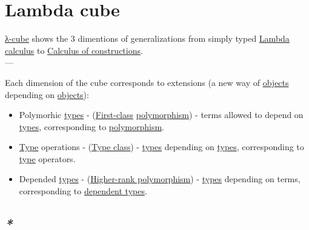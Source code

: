 \documentclass[a4paper,14pt,oneside]{book}
\begin{document}
\section{\label{org35d9cd3}Lambda cube}
\label{sec:orgd6a3689}
\hyperref[org9391efe]{λ-cube} shows the 3 dimentions of generalizations from simply typed \hyperref[orga8f06c0]{Lambda calculus} to \hyperref[org180624b]{Calculus of constructions}.\\

---\\


Each dimension of the cube corresponds to extensions (a new way of \hyperref[orgc4d2bb7]{objects} depending on \hyperref[orgc4d2bb7]{objects}):\\
\begin{itemize}
\item Polymorhic \hyperref[org7a67a19]{types} - (\hyperref[org2586625]{First-class} \hyperref[org91c794d]{polymorphism}) - terms allowed to depend on \hyperref[org7a67a19]{types}, corresponding to \hyperref[org91c794d]{polymorphism}.\\
\item \hyperref[org9303510]{Type} operations - (\hyperref[orgc7213a1]{Type class}) - \hyperref[org7a67a19]{types} depending on \hyperref[org7a67a19]{types}, corresponding to \hyperref[org9303510]{type} operators.\\
\item Depended \hyperref[org7a67a19]{types} - (\hyperref[org1c4fd3c]{Higher-rank polymorphism}) - \hyperref[org7a67a19]{types} depending on terms, corresponding to \hyperref[orgd842a92]{dependent types}.\\
\end{itemize}

\subsection{\emph{*}}
\label{sec:org0bed800}
\end{document}
